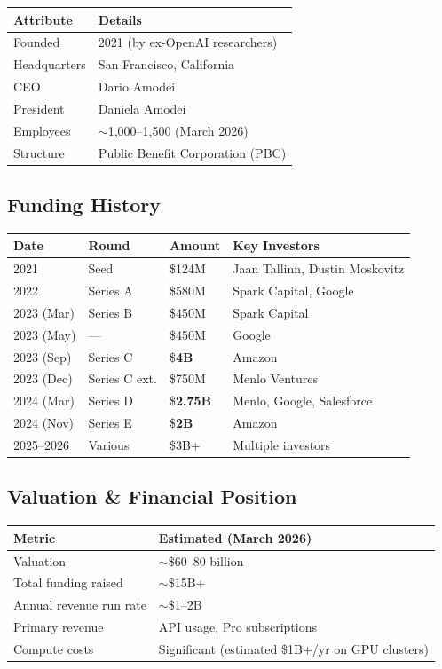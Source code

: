 \documentclass[11pt,a4paper]{article}
\begin{document}
\begin{center}
\begin{tabular}{ll}
\toprule
\textbf{Attribute} & \textbf{Details} \\
\midrule
Founded & 2021 (by ex-OpenAI researchers) \\
Headquarters & San Francisco, California \\
CEO & Dario Amodei \\
President & Daniela Amodei \\
Employees & $\sim$1,000--1,500 (March 2026) \\
Structure & Public Benefit Corporation (PBC) \\
\bottomrule
\end{tabular}
\end{center}

\subsection{Funding History}

\begin{center}
\begin{tabular}{llll}
\toprule
\textbf{Date} & \textbf{Round} & \textbf{Amount} & \textbf{Key Investors} \\
\midrule
2021 & Seed & \$124M & Jaan Tallinn, Dustin Moskovitz \\
2022 & Series A & \$580M & Spark Capital, Google \\
2023 (Mar) & Series B & \$450M & Spark Capital \\
2023 (May) & --- & \$450M & Google \\
2023 (Sep) & Series C & \$\textbf{4B} & Amazon \\
2023 (Dec) & Series C ext. & \$750M & Menlo Ventures \\
2024 (Mar) & Series D & \$\textbf{2.75B} & Menlo, Google, Salesforce \\
2024 (Nov) & Series E & \$\textbf{2B} & Amazon \\
2025--2026 & Various & \$3B+ & Multiple investors \\
\bottomrule
\end{tabular}
\end{center}

\subsection{Valuation \& Financial Position}

\begin{center}
\begin{tabular}{ll}
\toprule
\textbf{Metric} & \textbf{Estimated (March 2026)} \\
\midrule
Valuation & $\sim$\$60--80 billion \\
Total funding raised & $\sim$\$15B+ \\
Annual revenue run rate & $\sim$\$1--2B \\
Primary revenue & API usage, Pro subscriptions \\
Compute costs & Significant (estimated \$1B+/yr on GPU clusters) \\
\bottomrule
\end{tabular}
\end{center}
\end{document}
